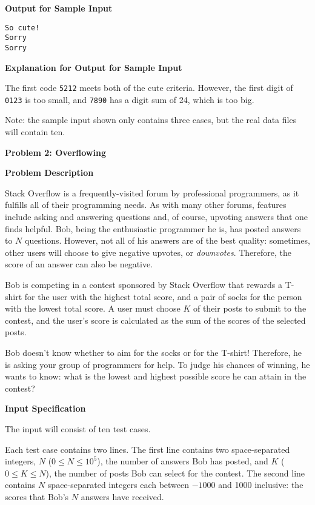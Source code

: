 \documentclass[11pt]{article}
\newcommand{\problem}[2]{\textbf{\Large Problem #1: #2} \vspace{0.4em}}
\newcommand{\heading}[1]{\vspace{0.6em} \textbf{#1}}
\begin{document}
\vspace{-\topsep}
\heading{Output for Sample Input}
\vspace{-\topsep}
\begin{verbatim}
So cute!
Sorry
Sorry
\end{verbatim}

\vspace{-\topsep}
\heading{Explanation for Output for Sample Input}

The first code \verb|5212| meets both of the cute criteria. However, the first digit of \verb|0123| is too small, and \verb|7890| has a digit sum of 24, which is too big.

Note: the sample input shown only contains three cases, but the real data files will contain ten.


\pagebreak




\problem{2}{Overflowing}


\heading{Problem Description}

Stack Overflow is a frequently-visited forum by professional programmers, as it fulfills all of their programming needs. As with many other forums, features include asking and answering questions and, of course, upvoting answers that one finds helpful. Bob, being the enthusiastic programmer he is, has posted answers to $N$ questions. However, not all of his answers are of the best quality: sometimes, other users will choose to give negative upvotes, or \textit{downvotes}. Therefore, the score of an answer can also be negative.

Bob is competing in a contest sponsored by Stack Overflow that rewards a T-shirt for the user with the highest total score, and a pair of socks for the person with the lowest total score. A user must choose $K$ of their posts to submit to the contest, and the user’s score is calculated as the sum of the scores of the selected posts. 

Bob doesn't know whether to aim for the socks or for the T-shirt! Therefore, he is asking your group of programmers for help. To judge his chances of winning, he wants to know: what is the lowest and highest possible score he can attain in the contest?

\heading{Input Specification}

The input will consist of ten test cases.

Each test case contains two lines. The first line contains two space-separated integers, $N$ ($0 \le N \le 10^5$), the number of answers Bob has posted, and $K$ ($0 \le K \le N$), the number of posts Bob can select for the contest. The second line contains $N$ space-separated integers each between $-1000$ and 1000 inclusive: the scores that Bob's $N$ answers have received.
\end{document}

